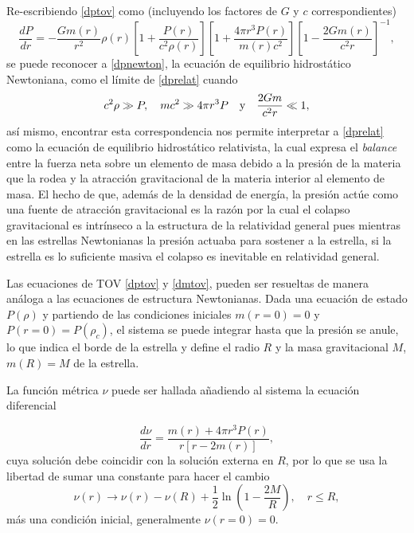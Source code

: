 Re-escribiendo \eqref{dptov} como (incluyendo los factores de $G$ y $c$ correspondientes)
\begin{equation}
    \frac { d P } { d r } =  - \frac { G  m ( r ) } { r ^ { 2 } } \rho ( r ) \left[ 1 + \frac { P ( r ) } {c ^ { 2 } \rho ( r ) } \right] \left[ 1 + \frac { 4 \pi r ^ { 3 } P ( r ) } { m ( r ) c ^ { 2 } } \right]  \left[ 1 - \frac { 2 G m ( r ) } { c ^ { 2 } r } \right] ^ { - 1 }, 
    \label{dprelat}
\end{equation}
se puede reconocer a \eqref{dpnewton}, la ecuación de equilibrio hidrostático Newtoniana, como el límite de \eqref{dprelat} cuando 
\begin{equation}
    c^2\rho \gg P \qc mc^2 \gg 4\pi r^3P \quad \text{y} \quad  \frac{2Gm}{c^2r}\ll 1,
\end{equation}
así mismo, encontrar esta correspondencia nos permite interpretar a \eqref{dprelat} como la ecuación de equilibrio hidrostático relativista, la cual expresa el \textit{balance} entre la fuerza neta sobre un elemento de masa debido a la presión de la materia que la rodea y la atracción gravitacional de la materia interior al elemento de masa. El hecho de que, además de la densidad de energía, la presión actúe como una fuente de atracción gravitacional es la razón por la cual el colapso gravitacional es intrínseco a la estructura de la relatividad general pues mientras en las estrellas Newtonianas la presión actuaba para sostener a la estrella, si la estrella es lo suficiente masiva el colapso es inevitable en relatividad general.

Las ecuaciones de TOV \eqref{dptov} y \eqref{dmtov}, pueden ser resueltas de manera análoga a las ecuaciones de estructura Newtonianas. Dada una ecuación de estado $P(\rho)$ y partiendo de las condiciones iniciales $m(r=0)=0$ y $P(r=0)=P(\rho_c)$, el sistema se puede integrar hasta que la presión se anule, lo que indica el borde de la estrella y define el radio $R$ y la masa gravitacional $M$, $m(R)=M$ de la estrella. 

La función métrica $\nu$ puede ser hallada añadiendo al sistema la ecuación diferencial

\begin{equation}
    \frac { d \nu } { d r } = \frac { m ( r ) + 4 \pi r ^ { 3 } P ( r ) } { r [ r - 2 m ( r ) ] },
\end{equation}
cuya solución debe coincidir con la solución externa en $R$, por lo que se usa la libertad de sumar una constante para hacer el cambio
\begin{equation}
    \nu ( r ) \longrightarrow \nu ( r ) - \nu ( R ) + \frac { 1 } { 2 } \ln \left( 1 - \frac { 2 M } { R } \right) , \quad r \leq R,
\end{equation}
más una condición inicial, generalmente $\nu(r=0)=0$.




